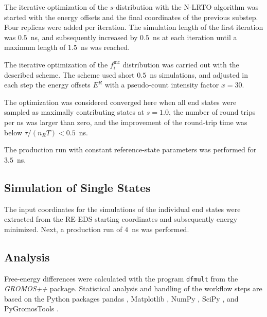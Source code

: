The iterative optimization of the $s$-distribution with the N-LRTO \cite{Sidler2017} algorithm was started with the energy offsets and the final coordinates of the previous substep.
Four replicas were added per iteration. 
The simulation length of the first iteration was $0.5$~ns, and subsequently increased by $0.5$~ns at each iteration until a maximum length of $1.5$~ns was reached.

The iterative optimization of the $f_i^{\text{mc}}$ distribution was carried out with the described scheme.
The scheme used short $0.5$~ns simulations, and adjusted in each step the energy offsets $E^R$ with a pseudo-count intensity factor $x = 30$.

The optimization was considered converged here when all end states were sampled as maximally contributing states at $s=1.0$, the number of round trips per ns was larger than zero, and the improvement of the round-trip time was below $\overline{\tau}/(n_RT) < 0.5$~ns.

The production run with constant reference-state parameters was performed for $3.5$~ns.

\subsection{Simulation of Single States}
The input coordinates for the simulations of the individual end states were extracted from the RE-EDS starting coordinates and subsequently energy minimized. Next, a production run of $4$~ns was performed. 

\subsection{Analysis}
Free-energy differences were calculated with the program {\tt{dfmult}} from the \textit{GROMOS++} \cite{Eichenberger2011} package.
Statistical analysis and handling of the workflow steps are based on the Python packages pandas \cite{Mckinney2010}, Matplotlib \cite{Hunter2007}, NumPy \cite{Vanderwalt2011}, SciPy \cite{Virtanen2020}, and PyGromosTools \cite{Ries2021}.

\FloatBarrier